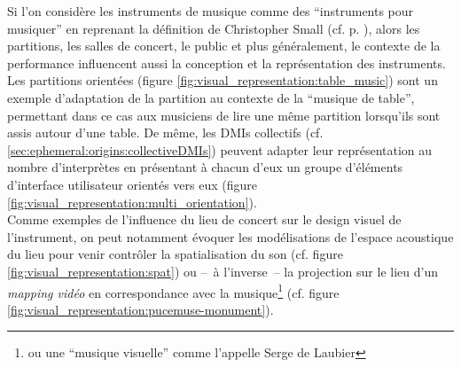 \noindent Si l'on considère les instruments de musique comme des ``instruments pour musiquer'' en reprenant la définition de Christopher Small (cf. p. \pageref{def:musicking}), alors les partitions, les salles de concert, le public et plus généralement, le contexte de la performance influencent aussi la conception et la représentation des instruments. Les partitions orientées (figure \ref{fig:visual_representation:table_music}) sont un exemple d'adaptation de la partition au contexte de la ``musique de table'', permettant dans ce cas aux musiciens de lire une même partition lorsqu'ils sont assis autour d'une table. De même, les \glspl{DMI} collectifs (cf. \ref{sec:ephemeral:origins:collectiveDMIs}) peuvent adapter leur représentation au nombre d'interprètes en présentant à chacun d'eux un groupe d'éléments d'interface utilisateur orientés vers eux (figure \ref{fig:visual_representation:multi_orientation}).\\
\indent Comme exemples de l'influence du lieu de concert sur le design visuel de l'instrument, on peut notamment évoquer les modélisations de l'espace acoustique du lieu pour venir contrôler la spatialisation du son (cf. figure \ref{fig:visual_representation:spat}) ou --~à l'inverse~-- la projection sur le lieu d'un \textit{mapping vidéo} en correspondance avec la musique\footnote{ou une ``musique visuelle'' comme l'appelle Serge de Laubier} (cf. figure \ref{fig:visual_representation:pucemuse-monument}).

